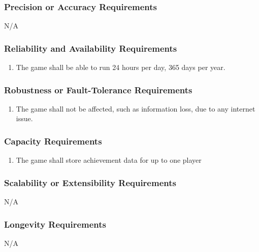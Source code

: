 \documentclass[12pt, titlepage]{article}
\begin{document}
\subsubsection{Precision or Accuracy Requirements}
\label{ssub:precision_or_accuracy_requirements}
N/A

\subsubsection{Reliability and Availability Requirements}
\label{ssub:reliability_and_availability_requirements}
\begin{enumerate}[start=3,label={ PR\arabic*.}]
        \item The game shall be able to run 24 hours per day, 365 days per year.
\end{enumerate}

\subsubsection{Robustness or Fault-Tolerance Requirements}
\label{ssub:robustness_or_fault_tolerance_requirements}
\begin{enumerate}[start=4,label={ PR\arabic*.}]
        \item The game shall not be affected, such as information loss, due to any internet issue.
\end{enumerate}

\subsubsection{Capacity Requirements}
\label{ssub:capacity_requirements}
\begin{enumerate}[start=5,label={ PR\arabic*.}]
        \item The game shall store achievement data for up to one player

\end{enumerate}

\subsubsection{Scalability or Extensibility Requirements}
\label{ssub:scalability_or_extensibility_requirements}
N/A

\subsubsection{Longevity Requirements}
\label{ssub:longevity_requirements}
N/A
\end{document}

